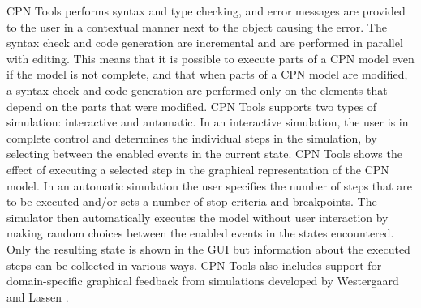 

CPN Tools performs syntax and type checking, and error messages are
provided to the user in a contextual manner next to the object causing
the error. The syntax check and code generation are incremental and
are performed in parallel with editing. This means that it is possible
to execute parts of a CPN model even if the model is not complete, and
that when parts of a CPN model are modified, a syntax check and code
generation are performed only on the elements that depend on the parts
that were modified. CPN Tools supports two types of simulation:
interactive and automatic. In an interactive simulation, the user is
in complete control and determines the individual steps in the
simulation, by selecting between the enabled events in the current
state. CPN Tools shows the effect of executing a selected step in the
graphical representation of the CPN model. In an automatic simulation
the user specifies the number of steps that are to be executed and/or
sets a number of stop criteria and breakpoints. The simulator then
automatically executes the model without user interaction by making
random choices between the enabled events in the states
encountered. Only the resulting state is shown in the GUI but
information about the executed steps can be collected in various
ways. CPN Tools also includes support for domain-specific graphical
feedback from simulations developed by Westergaard and Lassen
\cite{britney}.

